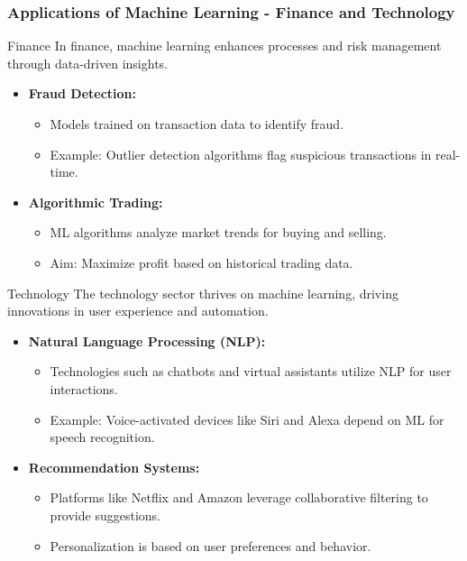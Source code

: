 \documentclass{beamer}
\begin{document}
\begin{frame}[fragile]
    \frametitle{Applications of Machine Learning - Finance and Technology}
    \begin{block}{Finance}
        In finance, machine learning enhances processes and risk management through data-driven insights.
        
        \begin{itemize}
            \item \textbf{Fraud Detection:} 
                \begin{itemize}
                    \item Models trained on transaction data to identify fraud.
                    \item Example: Outlier detection algorithms flag suspicious transactions in real-time.
                \end{itemize}
            \item \textbf{Algorithmic Trading:}
                \begin{itemize}
                    \item ML algorithms analyze market trends for buying and selling.
                    \item Aim: Maximize profit based on historical trading data.
                \end{itemize}
        \end{itemize}
    \end{block}
    
    \begin{block}{Technology}
        The technology sector thrives on machine learning, driving innovations in user experience and automation.
        
        \begin{itemize}
            \item \textbf{Natural Language Processing (NLP):} 
                \begin{itemize}
                    \item Technologies such as chatbots and virtual assistants utilize NLP for user interactions. 
                    \item Example: Voice-activated devices like Siri and Alexa depend on ML for speech recognition.
                \end{itemize}
            \item \textbf{Recommendation Systems:}
                \begin{itemize}
                    \item Platforms like Netflix and Amazon leverage collaborative filtering to provide suggestions.
                    \item Personalization is based on user preferences and behavior.
                \end{itemize}
        \end{itemize}
    \end{block}
\end{frame}
\end{document}
